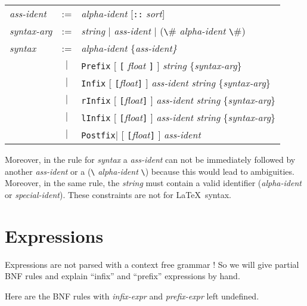 \begin{center}
\begin{tabular}{lcl}
{\it ass-ident} &:=& {\it alpha-ident} [\verb#::# {\it sort}] \\
{\it syntax-arg} &:=& {\it string} $|$ {\it ass-ident} $|$ (\verb#\# {\it
  alpha-ident} \verb#\#) \\
{\it syntax} &:=&
   {\it alpha-ident} \{\it ass-ident\} \\
  &$|$& 
  \verb#Prefix# [ \verb#[# {\it float} \verb#]# ] 
    {\it string} \{{\it syntax-arg}\} \\
  &$|$&
  \verb#Infix# [ \verb#[#{\it float}\verb#]# ] 
    {\it ass-ident} {\it string} \{{\it syntax-arg}\} \\
  &$|$&
  \verb#rInfix# [ \verb#[#{\it float}\verb#]# ] 
    {\it ass-ident} {\it string} \{{\it syntax-arg}\} \\
  &$|$&
  \verb#lInfix# [ \verb#[#{\it float}\verb#]# ] 
    {\it ass-ident} {\it string} \{{\it syntax-arg}\} \\
  &$|$&
  \verb#Postfix#$|$ [ \verb#[#{\it float}\verb#]# ] 
    {\it ass-ident}
\end{tabular}
\end{center}

Moreover, in the rule for {\it syntax} a {\it ass-ident} can not be immediately
followed by another {\it ass-ident} or a (\verb#\# {\it alpha-ident} \verb#\#)
because this would lead to ambiguities. Moreover, in the same rule, the {\it
string} must contain a valid identifier ({\it alpha-ident} or {\it
special-ident}). These constraints are not for \LaTeX\  syntax.

\section{Expressions}

Expressions are not parsed with a context free grammar ! So we will
give partial BNF rules and explain ``infix'' and ``prefix''
expressions by hand.

Here are the BNF rules with {\it infix-expr} and {\it prefix-expr}
left undefined.

